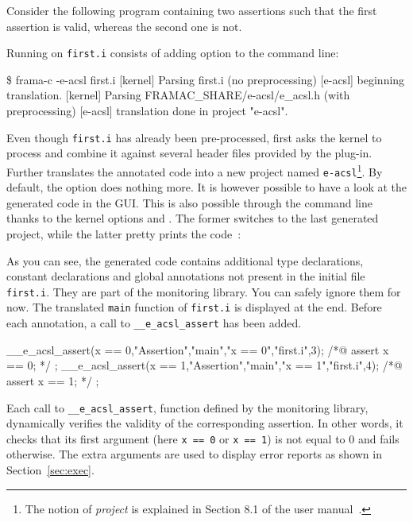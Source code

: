 Consider the following program containing two \eacsl assertions such that
the first assertion is valid, whereas the second one is not.


Running \eacsl on \texttt{first.i} consists of adding  option
to the \framac command line:
\begin{shell}
\$ frama-c -e-acsl first.i
[kernel] Parsing first.i (no preprocessing)
[e-acsl] beginning translation.
[kernel] Parsing FRAMAC_SHARE/e-acsl/e_acsl.h (with preprocessing)
[e-acsl] translation done in project "e-acsl".
\end{shell}

Even though \texttt{first.i} has already been pre-processed, \eacsl first asks
the \framac kernel to process and combine it against several header files
provided by the \eacsl plug-in.  Further \eacsl translates the annotated code
into a new \framac project named \texttt{e-acsl}\footnote{The notion of
  \emph{project} is explained in Section 8.1 of the \framac user
  manual~\cite{userman}.}. By default, the option  does nothing
more. It is however possible to have a look at the generated code in the
\framac GUI. This is also possible through the command line thanks to the
kernel options  and . The former
switches to the last generated project, while the latter pretty prints the \C
code~\cite{userman}:



As you can see, the generated code contains additional type declarations,
constant declarations and global \acsl annotations not present in the initial
file \texttt{first.i}. They are part of the \eacsl monitoring library. You can
safely ignore them for now. The translated \texttt{main} function of
\texttt{first.i} is displayed at the end. Before each \eacsl annotation,
a call to \texttt{\_\_e\_acsl\_assert} has been added.

\begin{minipage}{\linewidth}
\begin{ccode}
  __e_acsl_assert(x == 0,"Assertion","main","x == 0","first.i",3);
  /*@ assert x == 0; */ ;
  __e_acsl_assert(x == 1,"Assertion","main","x == 1","first.i",4);
  /*@ assert x == 1; */ ;
\end{ccode}
\end{minipage}

Each call to \texttt{\_\_e\_acsl\_assert}, function
defined by the \eacsl monitoring library, dynamically verifies the validity of
the corresponding assertion.  In other words, it checks that its first argument
(here \texttt{x == 0} or \texttt{x == 1}) is not equal to 0 and fails
otherwise. The extra arguments are used to display error reports as shown in
Section~\ref{sec:exec}.

